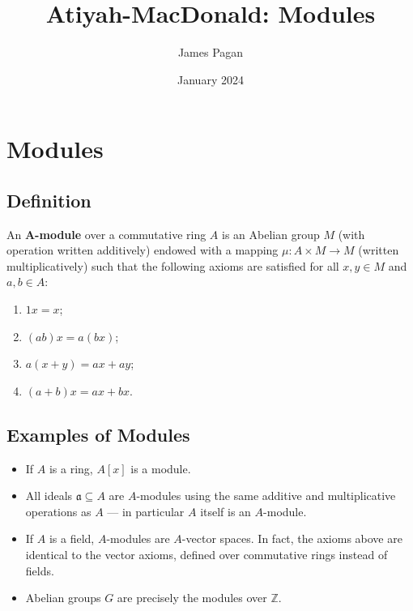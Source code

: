 \documentclass[11pt]{article}
\title{Atiyah-MacDonald: Modules}
\author{James Pagan}
\date{January 2024}
\begin{document}
\maketitle
\tableofcontents
\newpage


\section{Modules}


\subsection{Definition}

An \textbf{A-module} over a commutative ring $A$ is an Abelian group $M$ (with operation written additively) endowed with a mapping $\mu : A \times M \to M$ (written multiplicatively) such that the following axioms are satisfied for all $x, y \in M$ and $a, b \in A$:
\begin{enumerate}
	\item $1x = x$;
	\item $(ab)x = a(bx)$;
	\item $a(x + y) = ax + ay$;
	\item $(a + b)x = ax + bx$.
\end{enumerate}


\subsection{Examples of Modules}

\begin{itemize}
	\item If $A$ is a ring, $A[x]$ is a module.
	\item All ideals $\mathfrak{a} \subseteq A$ are $A$-modules using the same additive and multiplicative operations as $A$ --- in particular $A$ itself is an $A$-module.
	\item If $A$ is a field, $A$-modules are $A$-vector spaces. In fact, the axioms above are identical to the vector axioms, defined over commutative rings instead of fields.
	\item Abelian groups $G$ are precisely the modules over $\mathbb{Z}$.
\end{itemize}
\end{document}
